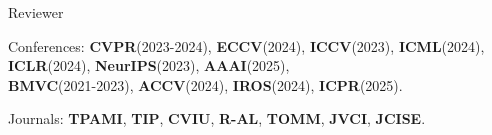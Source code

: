 


\begin{cventries}
\cvpub
{Reviewer} %
{ %
\begin{cvitems}
    \item {Conferences: \textbf{CVPR}(2023-2024), \textbf{ECCV}(2024), \textbf{ICCV}(2023), \textbf{ICML}(2024), 
        \textbf{ICLR}(2024), \textbf{NeurIPS}(2023), \textbf{AAAI}(2025), \\ 
        \indent \textbf{BMVC}(2021-2023), \textbf{ACCV}(2024), \textbf{IROS}(2024), \textbf{ICPR}(2025). }
    \item {Journals: \textbf{TPAMI}, \textbf{TIP}, \textbf{CVIU}, \textbf{R-AL}, \textbf{TOMM}, \textbf{JVCI}, \textbf{JCISE}.}
\end{cvitems}
}
\end{cventries}


